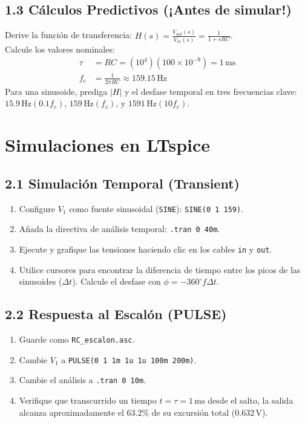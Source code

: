 \documentclass[11pt, a4paper]{article}
\begin{document}
\subsection{1.3 Cálculos Predictivos (¡Antes de simular!)}
Derive la función de transferencia: $\displaystyle H(s) = \frac{V_{out}(s)}{V_{in}(s)} = \frac{1}{1+sRC}$. \\
Calcule los valores nominales:
\begin{align*}
    \tau &= RC = (10^4)(100 \times 10^{-9}) = 1\,\text{ms} \\
    f_c &= \frac{1}{2\pi RC} \approx 159.15\,\text{Hz}
\end{align*}
Para una sinusoide, prediga $|H|$ y el desfase temporal en tres frecuencias clave:
$15.9\,\text{Hz} (0.1 f_c)$, $159\,\text{Hz} (f_c)$, y $1591\,\text{Hz} (10 f_c)$.

\section{Simulaciones en LTspice}

\subsection{2.1 Simulación Temporal (Transient)}
\begin{enumerate}
    \item Configure $V_1$ como fuente sinusoidal (\texttt{SINE}): \texttt{SINE(0 1 159)}.
    \item Añada la directiva de análisis temporal: \texttt{.tran 0 40m}.
    \item Ejecute y grafique las tensiones haciendo clic en los cables \texttt{in} y \texttt{out}.
    \item Utilice cursores para encontrar la diferencia de tiempo entre los picos de las sinusoides ($\Delta t$). Calcule el desfase con $\phi = -360^\circ f \Delta t$.
\end{enumerate}

\subsection{2.2 Respuesta al Escalón (PULSE)}
\begin{enumerate}
    \item Guarde como \texttt{RC\_escalon.asc}.
    \item Cambie $V_1$ a \texttt{PULSE(0 1 1m 1u 1u 100m 200m)}.
    \item Cambie el análisis a \texttt{.tran 0 10m}.
    \item Verifique que transcurrido un tiempo $t = \tau = 1\,\text{ms}$ desde el salto, la salida alcanza aproximadamente el $63.2\%$ de su excursión total ($0.632\,\text{V}$).
\end{enumerate}
\end{document}
